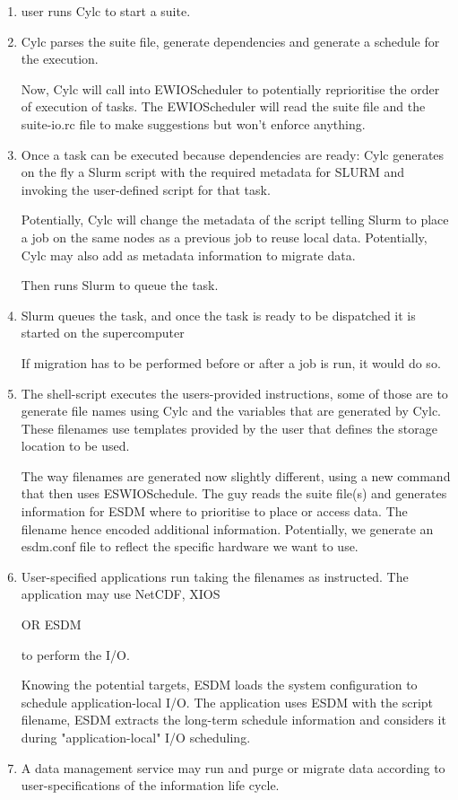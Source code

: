 \documentclass[a4paper]{article}
\begin{document}
\begin{enumerate}
  \item user runs Cylc to start a suite.
  \item Cylc parses the suite file, generate dependencies and generate a schedule for the execution.

  Now, Cylc will call into EWIOScheduler to potentially reprioritise the order of execution of tasks.
  The EWIOScheduler will read the suite file and the suite-io.rc file to make suggestions but won't enforce anything.

  \item Once a task can be executed because dependencies are ready: Cylc generates on the fly a Slurm script with the required metadata for SLURM and invoking the user-defined script for that task.

  Potentially, Cylc will change the metadata of the script telling Slurm to place a job on the same nodes as a previous job to reuse local data.
  Potentially, Cylc may also add as metadata information to migrate data.

  Then runs Slurm to queue the task.

  \item Slurm queues the task, and once the task is ready to be dispatched it is started on the supercomputer

  If migration has to be performed before or after a job is run, it would do so.

  \item The shell-script executes the users-provided instructions, some of those are to generate file names using Cylc and the variables that are generated by Cylc.
  These filenames use templates provided by the user that defines the storage location to be used.

  The way filenames are generated now slightly different, using a new command that then uses ESWIOSchedule.
  The guy reads the suite file(s) and generates information for ESDM where to prioritise to place or access data. The filename hence encoded additional information.
  Potentially, we generate an esdm.conf file to reflect the specific hardware we want to use.

  \item User-specified applications run taking the filenames as instructed.
    The application may use NetCDF, XIOS

    OR ESDM

    to perform the I/O.

Knowing the potential targets, ESDM loads the system configuration to schedule application-local I/O.
  The application uses ESDM with the script filename, ESDM extracts the long-term schedule information and considers it during "application-local" I/O scheduling.

  \item A data management service may run and purge or migrate data according to user-specifications of the information life cycle.

\end{enumerate}
\end{document}
